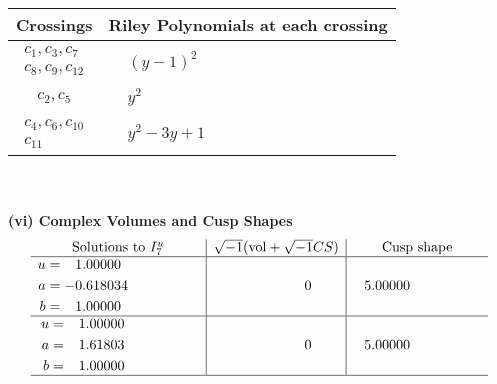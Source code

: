 \documentclass[1p]{elsarticle_modified}
\theoremstyle{definition}
\newcommand{\I}{\sqrt{-1}}
\begin{document}
\begin{tabular}{m{50pt}|m{274pt}}
Crossings & \hspace{64pt}Riley Polynomials at each crossing \\
\hline $$\begin{aligned}c_{1},c_{3},c_{7}\\c_{8},c_{9},c_{12}\end{aligned}$$&$\begin{aligned}
&(y-1)^2
\end{aligned}$\\
\hline $$\begin{aligned}c_{2},c_{5}\end{aligned}$$&$\begin{aligned}
&y^2
\end{aligned}$\\
\hline $$\begin{aligned}c_{4},c_{6},c_{10}\\c_{11}\end{aligned}$$&$\begin{aligned}
&y^2-3 y+1
\end{aligned}$\\
\hline
\end{tabular}\\~\\
\newpage\flushleft \textbf{(vi) Complex Volumes and Cusp Shapes}
$$\begin{array}{c|c|c}  
\text{Solutions to }I^u_{7}& \I (\text{vol} + \sqrt{-1}CS) & \text{Cusp shape}\\
 \hline 
\begin{aligned}
u &= \phantom{-}1.00000\phantom{ +0.000000I} \\
a &= -0.618034\phantom{ +0.000000I} \\
b &= \phantom{-}1.00000\phantom{ +0.000000I}\end{aligned}
 & \phantom{-0.000000 } 0 & \phantom{-}5.00000\phantom{ +0.000000I} \\ \hline\begin{aligned}
u &= \phantom{-}1.00000\phantom{ +0.000000I} \\
a &= \phantom{-}1.61803\phantom{ +0.000000I} \\
b &= \phantom{-}1.00000\phantom{ +0.000000I}\end{aligned}
 & \phantom{-0.000000 } 0 & \phantom{-}5.00000\phantom{ +0.000000I}\\
 \hline 
 \end{array}$$\newpage
\newpage\renewcommand{\arraystretch}{1}
\end{document}
